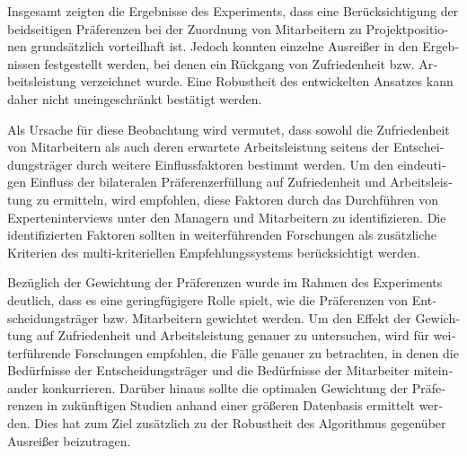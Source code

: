 \begin{otherlanguage}{ngerman}
Insgesamt zeigten die Ergebnisse des Experiments, dass eine Berücksichtigung der beidseitigen Präferenzen bei der Zuordnung von Mitarbeitern zu Projektpositionen grundsätzlich vorteilhaft ist.
Jedoch konnten einzelne Ausreißer in den Ergebnissen festgestellt werden, bei denen ein Rückgang von Zufriedenheit bzw. Arbeitsleistung verzeichnet wurde.
Eine Robustheit des entwickelten Ansatzes kann daher nicht uneingeschränkt bestätigt werden.

Als Ursache für diese Beobachtung wird vermutet, dass sowohl die Zufriedenheit von Mitarbeitern als auch deren erwartete Arbeitsleistung seitens der Entscheidungsträger durch weitere Einflussfaktoren bestimmt werden.
Um den eindeutigen Einfluss der bilateralen Präferenzerfüllung auf Zufriedenheit und Arbeitsleistung zu ermitteln, wird empfohlen, diese Faktoren durch das Durchführen von Experteninterviews unter den Managern und Mitarbeitern zu identifizieren.
Die identifizierten Faktoren sollten in weiterführenden Forschungen als zusätzliche Kriterien des multi-kriteriellen Empfehlungssystems berücksichtigt werden.

Bezüglich der Gewichtung der Präferenzen wurde im Rahmen des Experiments deutlich, dass es eine geringfügigere Rolle spielt, wie die Präferenzen von Entscheidungsträger bzw. Mitarbeitern gewichtet werden.
Um den Effekt der Gewichtung auf Zufriedenheit und Arbeitsleistung genauer zu untersuchen, wird für weiterführende Forschungen empfohlen, die Fälle genauer zu betrachten, in denen die Bedürfnisse der Entscheidungsträger und die Bedürfnisse der Mitarbeiter miteinander konkurrieren.
Darüber hinaus sollte die optimalen Gewichtung der Präferenzen in zukünftigen Studien anhand einer größeren Datenbasis ermittelt werden.
Dies hat zum Ziel zusätzlich zu der Robustheit des Algorithmus gegenüber Ausreißer beizutragen.

\end{otherlanguage}
